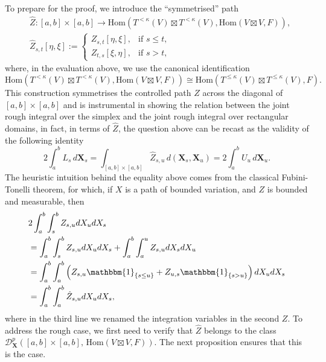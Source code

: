 \documentclass{article}%
\begin{document}
To prepare for the proof, we introduce the \enquote{symmetrised} path 
\begin{align*}
&\widehat{Z}:\left[  a,b\right]  \times\left[  a,b\right]  \rightarrow\mathrm{Hom}\left(
T^{<\kappa}\left(  V\right)  \boxtimes T^{<\kappa}\left(  V\right)
,\mathrm{Hom}(V\boxtimes V, F)\right),\\ 
&\widehat{Z}_{s,t}\left[\eta, \xi\right] :=
\begin{cases}
Z_{s,t}\left[\eta, \xi\right], & \text{if } s \le t,\\
Z_{t,s}\left[\xi, \eta\right], & \text{if } s > t,
\end{cases}
\end{align*}
where, in the evaluation above, we use the canonical identification
\[
\mathrm{Hom}\left(
T^{<\kappa}\left(  V\right)  \boxtimes T^{<\kappa}\left(  V\right)
,\mathrm{Hom}(V\boxtimes V, F)\right)
\cong \mathrm{Hom}\left(
T^{\leq \kappa}\left(  V\right)  \boxtimes T^{\leq \kappa}\left(  V\right)
, F\right).
\] 
This construction symmetrises the controlled path $Z$ across the diagonal of
$[a,b]\times[a,b]$ and is instrumental in showing the relation  between the joint rough integral over the simplex and the joint rough integral over rectangular domains, in fact, in terms of $\hat{Z}$, the question above can be recast as
the validity of the following identity
\begin{equation}\label{identity_tringular_Fubini}
2 \int_a^b L_s \, d\mathbf{X}_s
= \int_{[a,b]\times[a,b]} \widehat{Z}_{s,u} \, d(\mathbf{X}_s,\mathbf{X}_u)
= 2 \int_a^b U_u \, d\mathbf{X}_u .
\end{equation}
The heuristic intuition behind the equality above 
comes from the classical Fubini-Tonelli theorem, for which, if $X$ is a path of bounded variation, and $Z$ is bounded and measurable, then 
\begin{align*}
&2 \int_a^b \int_s^b Z_{s,u} dX_u dX_s\\
&=  \int_a^b \int_s^b Z_{s,u} dX_u dX_s + \int_a^b \int_a^u Z_{s,u} dX_s dX_u \\
&= \int_a^b \int_a^b \left(Z_{s,u} \mathbbm{1}_{\{s \le u\}} + Z_{u,s} \mathbbm{1}_{\{s > u\}}\right) dX_u dX_s\\
&= \int_a^b \int_a^b \hat{Z}_{s,u} dX_u dX_s,  
\end{align*}
where in the third line we renamed the integration variables in the second $Z$.\newline
To address the rough case, we first need to verify that $\widehat{Z}$ belongs to the class
$\mathcal{D}^{p}_{\mathbf{X}}\!\left([a,b]\times[a,b],\, \mathrm{Hom}(V\boxtimes V, F)\right)$.
The next proposition ensures that this is the case.
\end{document}
